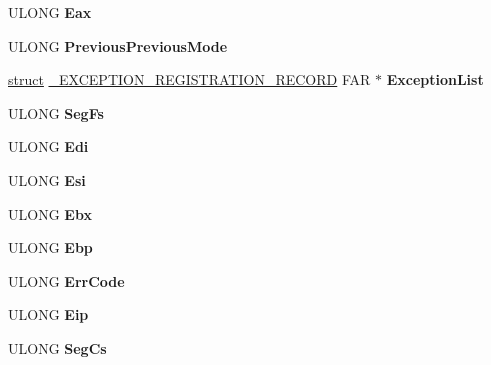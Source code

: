\begin{DoxyCompactItemize}
U\+L\+O\+NG {\bfseries Eax}
\item 
\mbox{\label{struct___k_t_r_a_p___f_r_a_m_e_a785cce55ec51e27c1355fbbcf60dd05f}} 
U\+L\+O\+NG {\bfseries Previous\+Previous\+Mode}
\item 
\mbox{\label{struct___k_t_r_a_p___f_r_a_m_e_ac44dd60beb0cba63ccf2164ca75ee80b}} 
\hyperlink{interfacestruct}{struct} \hyperlink{struct___e_x_c_e_p_t_i_o_n___r_e_g_i_s_t_r_a_t_i_o_n___r_e_c_o_r_d}{\+\_\+\+E\+X\+C\+E\+P\+T\+I\+O\+N\+\_\+\+R\+E\+G\+I\+S\+T\+R\+A\+T\+I\+O\+N\+\_\+\+R\+E\+C\+O\+RD} F\+AR $\ast$ {\bfseries Exception\+List}
\item 
\mbox{\label{struct___k_t_r_a_p___f_r_a_m_e_a1a2ffb5279346f2b745dd8f3059a7484}} 
U\+L\+O\+NG {\bfseries Seg\+Fs}
\item 
\mbox{\label{struct___k_t_r_a_p___f_r_a_m_e_a2c9199f7075b25ca6c8e4ce74e2e8173}} 
U\+L\+O\+NG {\bfseries Edi}
\item 
\mbox{\label{struct___k_t_r_a_p___f_r_a_m_e_af4bc5ca566acd6b1ec0787217999edbd}} 
U\+L\+O\+NG {\bfseries Esi}
\item 
\mbox{\label{struct___k_t_r_a_p___f_r_a_m_e_a6962df647a5ff3f1b37126c1a4767a9d}} 
U\+L\+O\+NG {\bfseries Ebx}
\item 
\mbox{\label{struct___k_t_r_a_p___f_r_a_m_e_a5484af17f9171431a85e3a02f497a8c8}} 
U\+L\+O\+NG {\bfseries Ebp}
\item 
\mbox{\label{struct___k_t_r_a_p___f_r_a_m_e_a6a813ca44b28db6f50d1b6fb4c7fcd8b}} 
U\+L\+O\+NG {\bfseries Err\+Code}
\item 
\mbox{\label{struct___k_t_r_a_p___f_r_a_m_e_a8cfa4b2260a09e0fae51cb634013c5fb}} 
U\+L\+O\+NG {\bfseries Eip}
\item 
\mbox{\label{struct___k_t_r_a_p___f_r_a_m_e_aac20b09c135265db30eef16ca0acbb8a}} 
U\+L\+O\+NG {\bfseries Seg\+Cs}

\end{DoxyCompactItemize}
